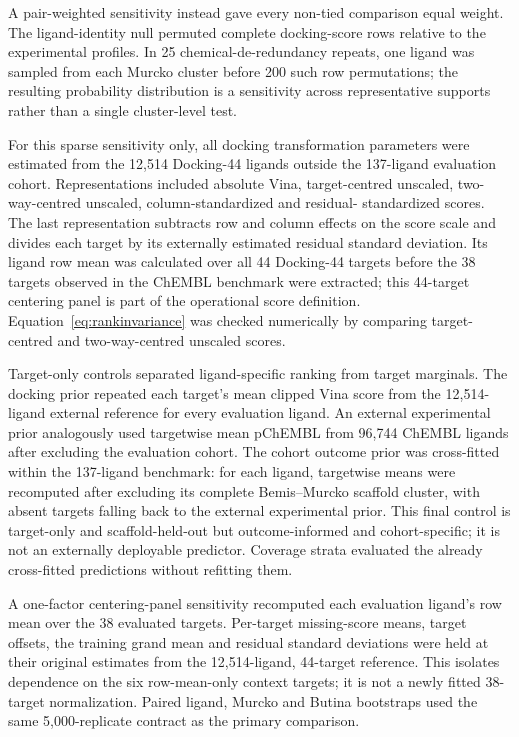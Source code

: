 \documentclass[11pt]{article}
\begin{document}
A pair-weighted sensitivity instead gave every non-tied comparison equal weight. The
ligand-identity null permuted complete docking-score rows relative to the experimental
profiles. In 25 chemical-de-redundancy repeats, one ligand was sampled from each Murcko
cluster before 200 such row permutations; the resulting probability distribution is a
sensitivity across representative supports rather than a single cluster-level test.

For this sparse sensitivity only, all docking transformation parameters were estimated from the 12,514 Docking-44 ligands
outside the 137-ligand evaluation cohort. Representations included absolute Vina,
target-centred unscaled, two-way-centred unscaled, column-standardized and residual-
standardized scores. The last representation subtracts row and column effects on the score
scale and divides each target by its externally estimated residual standard deviation. Its
ligand row mean was calculated over all 44 Docking-44 targets before the 38 targets observed
in the ChEMBL benchmark were extracted; this 44-target centering panel is part of the
operational score definition.
Equation~\ref{eq:rankinvariance} was checked numerically by comparing target-centred and
two-way-centred unscaled scores.

Target-only controls separated ligand-specific ranking from target marginals. The docking
prior repeated each target's mean clipped Vina score from the 12,514-ligand external
reference for every evaluation ligand. An external experimental prior analogously used
targetwise mean pChEMBL from 96,744 ChEMBL ligands after excluding the evaluation cohort.
The cohort outcome prior was cross-fitted within the 137-ligand benchmark: for each ligand,
targetwise means were recomputed after excluding its complete Bemis--Murcko scaffold
cluster, with absent targets falling back to the external experimental prior. This final
control is target-only and scaffold-held-out but outcome-informed and cohort-specific; it is
not an externally deployable predictor. Coverage strata evaluated the already cross-fitted
predictions without refitting them.

A one-factor centering-panel sensitivity recomputed each evaluation ligand's row mean over
the 38 evaluated targets. Per-target missing-score means, target offsets, the training grand
mean and residual standard deviations were held at their original estimates from the
12,514-ligand, 44-target reference. This isolates dependence on the six row-mean-only
context targets; it is not a newly fitted 38-target normalization. Paired ligand, Murcko and
Butina bootstraps used the same 5,000-replicate contract as the primary comparison.
\end{document}
